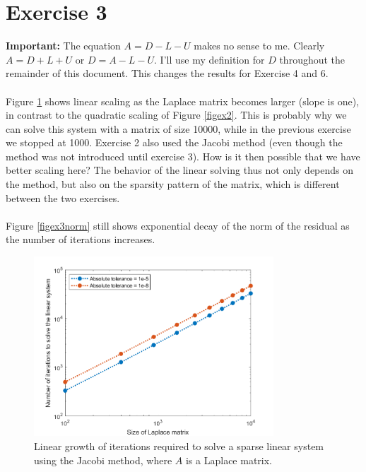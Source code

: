 \documentclass{article}
\begin{document}
\section*{Exercise 3}
\textbf{Important:} The equation $A = D - L - U$ makes no sense to me. Clearly $A = D + L + U$ or 
$D = A - L - U$. I'll use my definition for $D$ throughout the remainder of this document. This changes the results for Exercise 4 and 6.
\\
\\
Figure \ref{figex3} shows linear scaling as the Laplace matrix becomes larger (slope is one), in contrast to the quadratic scaling of Figure \ref{figex2}. This is probably why we can solve this system with a matrix of size 10000, while in the previous exercise we stopped at 1000. Exercise 2 also used the Jacobi method (even though the method was not introduced until exercise 3). How is it then possible that we have better scaling here? The behavior of the linear solving thus not only depends on the method, but also on the sparsity pattern of the matrix, which is different between the two exercises.
\\
\\
Figure \ref{figex3norm} still shows exponential decay of the norm of the residual as the number of iterations increases. 
\begin{figure}[H]
	\centering
	\includegraphics[width=0.8\textwidth]{ex3.png}
	\caption{Linear growth of iterations required to solve a sparse linear system using the Jacobi method,  where $A$ is a Laplace matrix.}
	\label{figex3}
\end{figure}
\end{document}
